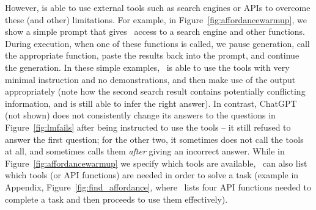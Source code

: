 However,  \DV is able to use external tools such as search engines or APIs to overcome these (and other) limitations. For example, in Figure~\ref{fig:affordancewarmup}, we show a simple prompt that gives \DV\ access to a search engine and other functions. During execution, when one of these functions is called, we pause generation, call the appropriate function, paste the results back into the prompt, and continue the generation.
In these simple examples, \DV\ is able to use the tools with very minimal instruction and no demonstrations, and then make use of the output appropriately (note how the second search result contains potentially conflicting information, and \DV is still able to infer the right answer).
In contrast, ChatGPT (not shown) does not consistently change its answers to the questions in Figure~\ref{fig:lmfails} after being instructed to use the tools --  it still refused to answer the first question; for the other two, it sometimes does not call the tools at all, and sometimes calls them \emph{after} giving an incorrect answer.
While in Figure~\ref{fig:affordancewarmup} we specify which tools are available, \DV\ can also list which tools (or API functions) are needed in order to solve a task (example in Appendix, Figure~\ref{fig:find_affordance}, where \DV\ lists four API functions needed to complete a task and then proceeds to use them effectively).




